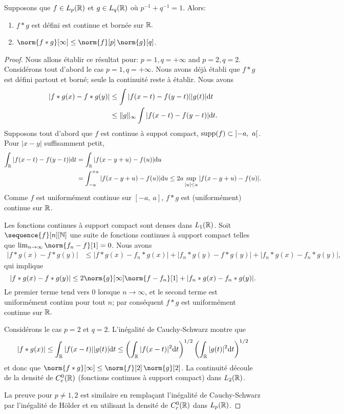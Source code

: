 \begin{proposition}
Supposons que $f\in L_{p}(\mathbb{R})$ et $g\in L_{q}(\mathbb{R})$ o\`u $p^{-1}+q^{-1}=1$. Alors:
\begin{enumerate}[label=(\roman*)]
\item $f*g$ est d\'efini est continue et born\'ee sur  $\mathbb{R}.$
\item $\norm{f*g}[\infty]\leq \norm{f}[p] \, \norm{g}[q]$.
\end{enumerate}
\end{proposition}
\begin{proof}
Nous allons \'etablir ce r\'esultat pour: $p=1,  q=+\infty$ and $p=2, q=2.$
Consid\'erons tout d'abord le cas $p=1, q=+\infty.$
Nous avons d\'ej\`a \'etabli  que $f*g$ est d\'efini partout et born\'e; seule la continuit\'e reste \`a \'etablir. Nous avons
\begin{align*}
|f*g(x)-f*g(y)| &\leq\int|f(x-t)-f(y-t)||g(t)|\mathrm{d} t \\
&\leq\Vert g\Vert_{\infty}\int|f(x-t)-f(y-t)|\mathrm{d} t.
\end{align*}
 Supposons tout d'abord que $f$ est continue \`a suppot compact, $\mathrm{supp}(f) \subset\left]-a,\ a\right[$.
 Pour $|x-y|$ suffisamment petit,
\begin{align*}
\int_{\mathbb{R}}|f(x-t)-f(y-t)|\mathrm{d} t
&=\int_{\mathbb{R}}|f(x-y+u)-f(u)|\mathrm{d} u \\
&=\int_{-a}^{+a}|f(x-y+u)-f(u)|\mathrm{d} u \leq 2a\sup_{|u|\leq a}|f(x-y+u)-f(u)|.
\end{align*}
Comme $f$ est uniform\'ement continue sur $[-a,\ a]$,  $f*g$ est (uniform\'ement) continue sur $\mathbb{R}$.

Les fonctions continues \`a support compact sont denses dans $L_1(\mathbb{R})$.
Soit $\sequence{f}[n][\nset]$ une suite de fonctions continues \`a support compact telles que
$\lim_{n\rightarrow\infty} \norm{f_{n}-f}[1]=0$. Nous avons
\begin{align*}
|f*g(x)-f*g(y)|&\leq|f*g(x)-f_{n}*g(x)|+|f_{n}*g(y)-f*g(y)| +|f_{n}*g(x)-f_{n}*g(y)|,
\end{align*}
qui implique
$$
|f*g(x)-f*g(y)|\leq 2 \norm{g}[\infty] \norm{f-f_{n}}[1]+|f_{n}*g(x)-f_{n}*g(y)|.
$$
Le premier terme tend vers $0$ lorsque $n \to \infty$, et le second terme est uniform\'ement continu pour tout $n$;
par cons\'equent $f*g$ est uniform\'ement continue sur $\mathbb{R}.$



Consid\'erons le cas $p=2$ et  $q=2$. L'in\'egalit\'e de Cauchy-Schwarz montre que
$$
|f*g(x)|\displaystyle \leq\int_{\mathbb{R}}|f(x-t)||g(t)|\mathrm{d} t\leq \left(\int_{\mathbb{R}}|f(x-t)|^{2}\mathrm{d} t\right)^{1/2} \left(\int_{\mathbb{R}}|g(t)|^{2}\mathrm{d} t \right)^{1/2}
$$
 et donc que $\norm{f*g}[\infty] \leq \norm{f}[2] \, \norm{g}[2]$.
  La continuit\'e d\'ecoule de la densit\'e de $C_{c}^{0}(\mathbb{R})$  (fonctions continues \`a support compact) dans $L_{2}(\mathbb{R})$.

La preuve pour $p\neq 1,2$ est similaire en rempla\c{c}ant l'in\'egalit\'e de Cauchy-Schwarz par l'in\'egalit\'e de H\"older et en utilisant la densit\'e de $C_c^0(\mathbb{R})$ dans $L_p(\mathbb{R})$.
\end{proof}


